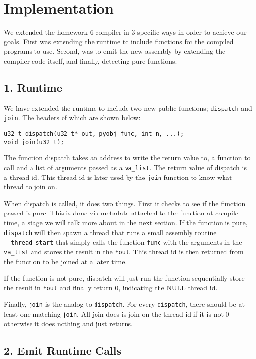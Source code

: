 \documentclass{acm_proc_article-sp}
\begin{document}
\section*{Implementation}

We extended the homework 6 compiler in 3 specific ways in order to achieve our
goals. First was extending the runtime to include functions for the compiled
programs to use. Second, was to emit the new assembly by extending the compiler
code itself, and finally, detecting pure functions.

\subsection*{1. Runtime}
We have extended the runtime to include two new public functions; \verb|dispatch| and
\verb|join|. The headers of which are shown below:

\begin{verbatim}
u32_t dispatch(u32_t* out, pyobj func, int n, ...);
void join(u32_t);
\end{verbatim}

The function dispatch takes an address to write the return value to, a function
to call and a list of arguments passed as a \verb|va_list|. The return value of
dispatch is a thread id. This thread id is later used by the \verb|join| function
to know what thread to join on.

When dispatch is called, it does two things. First it checks to see if the
function passed is pure. This is done via metadata attached to the function at
compile time, a stage we will talk more about in the next section. If the
function is pure, \verb|dispatch| will then spawn a thread that runs a small
assembly routine \verb|__thread_start| that simply calls the function
\verb|func| with the arguments in the \verb|va_list| and stores the result in
the \verb|*out|. This thread id is then returned from the function to be joined
at a later time.

If the function is not pure, dispatch will just run the function sequentially
store the result in \verb|*out| and finally return 0, indicating the NULL
thread id.

Finally, \verb|join| is the analog to \verb|dispatch|. For every \verb|dispatch|,
there should be at least one matching \verb|join|. All join does is join on the thread
id if it is not 0 otherwise it does nothing and just returns.

\subsection*{2. Emit Runtime Calls}
\end{document}
